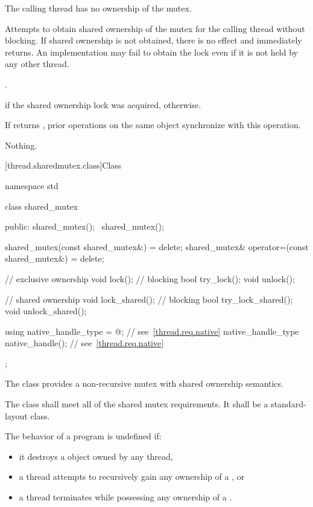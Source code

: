 \begin{itemdescr}
\pnum
\requires The calling thread has no ownership of the mutex.

\pnum
\effects Attempts to obtain shared ownership of the mutex for the calling
thread without blocking. If shared ownership is not obtained, there is no
effect and  immediately returns. An implementation
may fail to obtain the lock even if it is not held by any other thread.

\pnum
\returntype {}.

\pnum
\returns {} if the shared ownership lock was acquired, 
otherwise.

\pnum
\sync If  returns , prior 
operations on the same object synchronize with this
operation.

\pnum
\throws Nothing.
\end{itemdescr}

[thread.sharedmutex.class]{Class }

%
\begin{codeblock}
namespace std {
  class shared_mutex {
  public:
    shared_mutex();
    ~shared_mutex();

    shared_mutex(const shared_mutex&) = delete;
    shared_mutex& operator=(const shared_mutex&) = delete;

    // exclusive ownership
    void lock();                // blocking
    bool try_lock();
    void unlock();

    // shared ownership
    void lock_shared();         // blocking
    bool try_lock_shared();
    void unlock_shared();

    using native_handle_type = @\impdefnc@;          // see~\ref{thread.req.native}
    native_handle_type native_handle();                         // see~\ref{thread.req.native}
  };
}
\end{codeblock}

\pnum
The class  provides a non-recursive mutex
with shared ownership semantics.

\pnum
The class  shall meet all of the
shared mutex requirements.
It shall be a standard-layout class.

\pnum
The behavior of a program is undefined if:
\begin{itemize}
\item it destroys a  object owned by any thread,
\item a thread attempts to recursively gain any ownership of a , or
\item a thread terminates while possessing any ownership of a .
\end{itemize}

